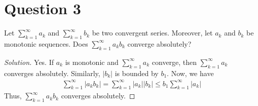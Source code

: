 \documentclass[a4paper]{article}
\theoremstyle{definition}
\begin{document}
\section{Question 3}
Let \(\sum_{k=1}^\infty a_k\) and \(\sum_{k=1}^\infty b_k\) be two convergent series. Moreover, let \(a_k\) and \(b_k\) be monotonic sequences. Does \(\sum_{k=1}^{\infty}a_k b_k\) converge absolutely?
\begin{proof}[Solution]
    Yes. If \(a_k\) is monotonic and \(\sum_{k=1}^{\infty} a_k\) converge, then \(\sum_{k=1}^\infty a_k\) converges absolutely. Similarly, \(|b_k|\) is bounded by \(b_1\). Now, we have
    \begin{align*}
        \sum_{k=1}^{\infty} |a_k b_k | = \sum_{k=1}^{\infty} |a_k || b_k | \leq b_1 \sum_{k=1}^{\infty} |a_k |
    \end{align*}
    Thus, \(\sum_{k=1}^\infty a_k b_k\) converges absolutely.
\end{proof}
\end{document}
